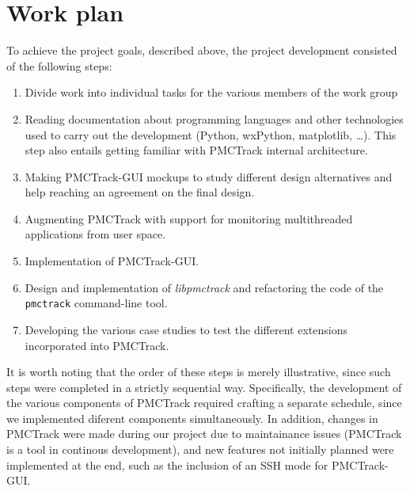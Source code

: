 \section{Work plan}\label{workplan}

To achieve the project goals, described above, the
project development consisted of the following steps:

\begin{enumerate}
\def\labelenumi{\arabic{enumi}.}
\itemsep1pt\parskip0pt
\item
  Divide work into individual tasks for the various members of the work group
\item
  Reading documentation about programming languages and other
  technologies used to carry out the development (Python, wxPython,
  matplotlib, \ldots). This step also entails getting familiar with PMCTrack internal architecture.
\item
  Making PMCTrack-GUI mockups to study different design alternatives and
  help reaching an agreement on the final design.
\item
  Augmenting PMCTrack with support for monitoring multithreaded applications from user space.
\item
  Implementation of PMCTrack-GUI.
\item
  Design and implementation of \emph{libpmctrack} and refactoring the
  code of the \texttt{pmctrack} command-line tool.
\item
  Developing the various case studies to test the different extensions incorporated into PMCTrack.
\end{enumerate}

It is worth noting that the order of these steps is merely
illustrative, since such steps were completed in a strictly sequential
way. Specifically, the development of the various components of PMCTrack required crafting a separate schedule, since we implemented diferent components simultaneously. In addition, changes in PMCTrack were made during our project due to maintainance issues (PMCTrack is a
tool in continous development), and new features not initially planned were implemented at the end, such as the inclusion of an SSH mode for PMCTrack-GUI. 
